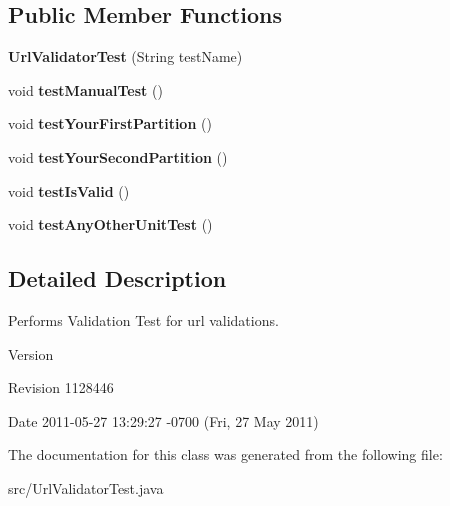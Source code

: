 \subsection*{Public Member Functions}
\begin{DoxyCompactItemize}
\item 
{\bfseries Url\+Validator\+Test} (String test\+Name)\hypertarget{classUrlValidatorTest_a4796e3be2cbb63250e9bf3c6a96c84eb}{}\label{classUrlValidatorTest_a4796e3be2cbb63250e9bf3c6a96c84eb}

\item 
void {\bfseries test\+Manual\+Test} ()\hypertarget{classUrlValidatorTest_a41ceee2038da5ca23bbec7c9270d5009}{}\label{classUrlValidatorTest_a41ceee2038da5ca23bbec7c9270d5009}

\item 
void {\bfseries test\+Your\+First\+Partition} ()\hypertarget{classUrlValidatorTest_aa26e45c1e214b9c3daab746dbb788315}{}\label{classUrlValidatorTest_aa26e45c1e214b9c3daab746dbb788315}

\item 
void {\bfseries test\+Your\+Second\+Partition} ()\hypertarget{classUrlValidatorTest_a5a8fa86d6116d95574b69a739f839fd3}{}\label{classUrlValidatorTest_a5a8fa86d6116d95574b69a739f839fd3}

\item 
void {\bfseries test\+Is\+Valid} ()\hypertarget{classUrlValidatorTest_a46c190729e25d1f0a4ab52ec51f0397e}{}\label{classUrlValidatorTest_a46c190729e25d1f0a4ab52ec51f0397e}

\item 
void {\bfseries test\+Any\+Other\+Unit\+Test} ()\hypertarget{classUrlValidatorTest_a6abe80d9902e0d05e0298c9f149f060f}{}\label{classUrlValidatorTest_a6abe80d9902e0d05e0298c9f149f060f}

\end{DoxyCompactItemize}


\subsection{Detailed Description}
Performs Validation Test for url validations.

\begin{DoxyVersion}{Version}

\end{DoxyVersion}
\begin{DoxyParagraph}{Revision}
1128446 
\end{DoxyParagraph}
\begin{DoxyParagraph}{Date}
2011-\/05-\/27 13\+:29\+:27 -\/0700 (Fri, 27 May 2011) 
\end{DoxyParagraph}


The documentation for this class was generated from the following file\+:\begin{DoxyCompactItemize}
\item 
src/Url\+Validator\+Test.\+java\end{DoxyCompactItemize}
